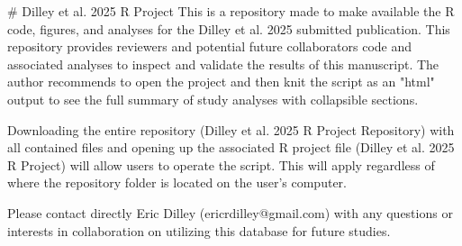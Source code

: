 # Dilley et al. 2025 R Project
This is a repository made to make available the R code, figures, and analyses for the Dilley et al. 2025 submitted publication.  This repository provides reviewers and potential future collaborators code and associated analyses to inspect and validate the results of this manuscript.  The author recommends to open the project and then knit the script as an "html" output to see the full summary of study analyses with collapsible sections.

Downloading the entire repository (Dilley et al. 2025 R Project Repository) with all contained files and opening up the associated R project file (Dilley et al. 2025 R Project) will allow users to operate the script.  This will apply regardless of where the repository folder is located on the user's computer.

Please contact directly Eric Dilley (ericrdilley@gmail.com) with any questions or interests in collaboration on utilizing this database for future studies.  